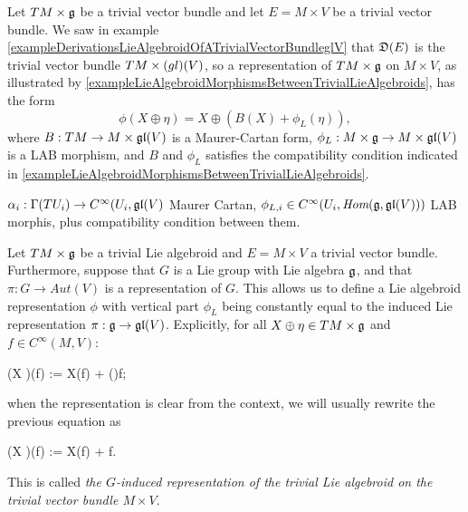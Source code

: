 \begin{example}
\label{exampleAllRepresentationsofTLAoverTrivialVectorbundle}
Let $TM \times \mathfrak{g}$ be a trivial vector bundle and let $E = M \times V$ be a trivial vector bundle. We saw in example \ref{exampleDerivationsLieAlgebroidOfATrivialVectorBundleglV} that $\mathfrak{D}(E)$ is the trivial vector bundle $TM \times \mathfrak{(}gl)(V)$, so a representation of $TM \times \mathfrak{g}$ on $M \times V$, as illustrated by \ref{exampleLieAlgebroidMorphismsBetweenTrivialLieAlgebroids}, has the form
\begin{equation}
    \phi(X \oplus \eta) = X \oplus(B(X) + \phi_L(\eta)),
\end{equation}
where $B: TM \to M\times \mathfrak{gl}(V)$ is a Maurer-Cartan form, $\phi_L: M \times \alg g \to M \times \alg{gl}(V)$ is a LAB morphism, and $B$ and $\phi_L$ satisfies the compatibility condition indicated in \ref{exampleLieAlgebroidMorphismsBetweenTrivialLieAlgebroids}.

$\alpha_i: \Gamma(TU_i) \to C^\infty(U_i, \mathfrak{gl}(V)$ Maurer Cartan, $\phi_{L, i} \in C^\infty(U_i, \Hom(\alg g, \alg{gl}(V)))$ LAB morphis, plus compatibility condition between them.
\end{example}


\begin{example}
\label{definitionExampleGroupInducedRepresentationTrivialLieAlgebroidTLAOnTrivialVectorBundle}
Let $TM \times \mathfrak{g}$ be a trivial Lie algebroid and $E = M \times V$ a trivial vector bundle. Furthermore, suppose that $G$ is a Lie group with Lie algebra $\mathfrak{g}$, and that $\pi: G \to Aut(V)$ is a representation of $G$. This allows us to define a Lie algebroid representation $\phi$ with vertical part $\phi_L$ being constantly equal to the induced Lie representation $\pi: \mathfrak{g} \to \mathfrak{gl}(V)$. Explicitly, for all $X \oplus \eta \in TM \times \mathfrak{g}$ and $f \in C^\infty(M, V)$:
\begin{eqnsplit}\label{equationGroupInducedRepresentationInTrivialAlgebroids}
    \phi(X \oplus \eta)(f) := X(f) + \pi(\eta)f;
\end{eqnsplit}
when the representation is clear from the context, we will usually rewrite the previous equation as
\begin{eqnsplit}\label{equationGroupInducedRepresentationInTrivialAlgebroids}
    \phi(X \oplus \eta)(f) := X(f) + \eta \cdot f.
\end{eqnsplit}
This is called \emph{the $G$-induced representation of the trivial Lie algebroid on the trivial vector bundle $M\times V$}.
\end{example}


